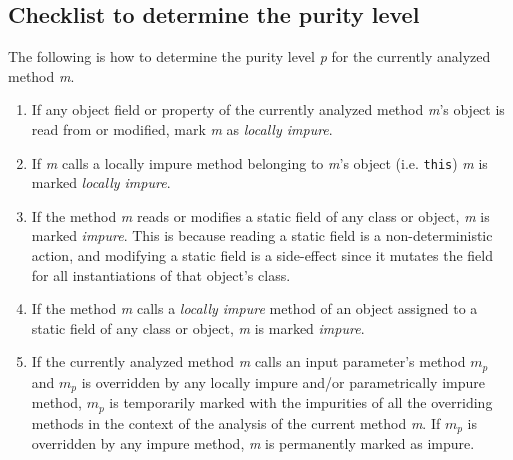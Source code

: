 \documentclass[a4paper,12pt]{article}
\begin{document}
\subsection{Checklist to determine the purity level} \label{sub:checklist-to-determine-the-purity-level}

The following is how to determine the purity level \textit{p} for the currently analyzed method \textit{m}.

\begin{enumerate}
  \item If any object field or property of the currently analyzed method \textit{m}'s object is read from or modified, mark \textit{m} as \textit{locally impure}. \label{itm:locally-impure}
  \item If \textit{m} calls a locally impure method belonging to \textit{m}'s object (i.e. \texttt{this}) \textit{m} is marked \textit{locally impure}.
  \item If the method \textit{m} reads or modifies a static field of any class or object, \textit{m} is marked \textit{impure}. This is because reading a static field is a non-deterministic action, and modifying a static field is a side-effect since it mutates the field for all instantiations of that object's class. \label{itm:static-impure}
  \item If the method \textit{m} calls a \textit{locally impure} method of an object assigned to a static field of any class or object, \textit{m} is marked \textit{impure}.
  \item If the currently analyzed method \textit{m} calls an input parameter's method $m_p$ and $m_p$ is overridden by any locally impure and/or parametrically impure method, $m_p$ is temporarily marked with the impurities of all the overriding methods in the context of the analysis of the current method \textit{m}. If $m_p$ is overridden by any impure method, \textit{m} is permanently marked as impure.

\end{enumerate}
\end{document}
